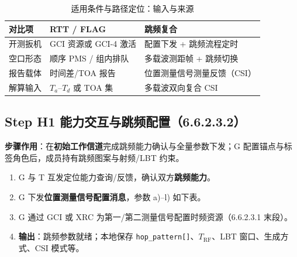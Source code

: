 \documentclass[11pt,a4paper]{ctexart}
\begin{document}
\begin{longtable}{L{2.2cm}L{4.5cm}L{4.5cm}}
\caption{适用条件与路径定位：输入与来源\label{tab:step111}} \\
\toprule
\textbf{对比项} & \textbf{RTT / FLAG} & \textbf{跳频复合} \\
\midrule
开测扳机 & GCI 资源或 GCI-4 激活 & 配置下发 + 跳频流程定时 \\
空口形态 & 顺序 PMS / 组内排队 & 多载波测距帧 + 跳频切换 \\
报告载体 & 时间差/TOA 报告 & 位置测量信号测量反馈（CSI） \\
解算输入 & $T_a$--$T_d$ 或 TOA 集 & 多载波双向复合 CSI \\
\bottomrule
\end{longtable}

\subsection{Step H1 能力交互与跳频配置（6.6.2.3.2）}

\textbf{步骤作用}：在\textbf{初始工作信道}完成跳频能力确认与全量参数下发；G 配置锚点与标签角色后，成员持有跳频图案与射频/LBT 约束。

\begin{enumerate}
  \item G 与 T 互发定位能力查询/反馈，确认双方\textbf{跳频能力}。
  \item G 下发\textbf{位置测量信号配置消息}，参数 a)--l) 如下表。
  \item G 通过 GCI 或 XRC 为第一/第二测量信号配置时频资源（6.6.2.3.1 末段）。
  \item \textbf{输出}：跳频参数就绪；本地保存 \texttt{hop\_pattern[]}、$T_{\mathrm{RF}}$、LBT 窗口、生成方式、CSI 模式等。
\end{enumerate}
\end{document}
